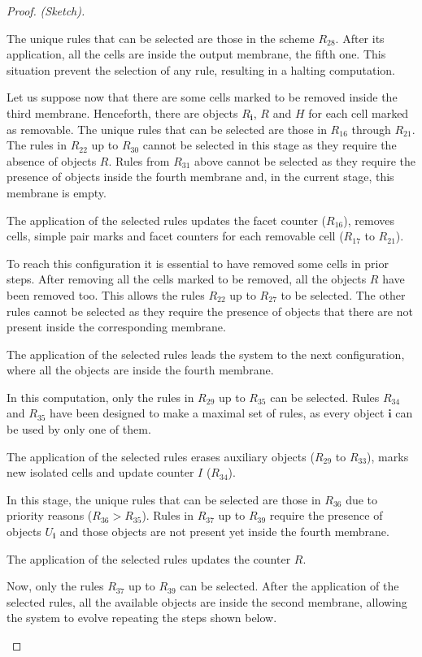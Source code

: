\documentclass[journal]{IEEEtran}
\begin{document}
\begin{proof} {\it (Sketch).}
\begin{list}{\textbf{Step }}{}
\begin{list}{)}{}
The unique rules that can be selected are those in the scheme $R_{28}$. After its
application, all the cells are inside the output membrane, the fifth one. This
situation prevent the selection of any rule, resulting in a halting computation.
\item Let us suppose now that there are some cells marked to be removed inside the third
membrane. Henceforth, there are objects $R_\mathbf{i}$, $R$ and $H$ for each
cell marked as removable. The unique rules that can be selected are those in
$R_{16}$ through $R_{21}$. The rules in $R_{22}$ up to $R_{30}$ cannot be
selected in this stage as they require the absence of objects $R$. Rules from
$R_{31}$ above cannot be selected as they require the presence of objects
inside the fourth membrane and, in the current stage, this membrane is empty.

The application of the selected rules updates the facet counter
($R_{16}$), removes cells, simple pair marks and facet counters for
each removable cell ($R_{17}$ to $R_{21}$).
\end{list}
\item To reach this configuration it is essential to have removed some cells in
prior steps. After removing all the cells marked to be removed, all the objects
$R$ have been removed too. This allows the rules $R_{22}$ up to $R_{27}$ to be
selected. The other rules cannot be selected as they require the presence of
objects that there are not present inside the corresponding membrane.

The application of the selected rules leads the system to the next
configuration, where all the objects are inside the fourth membrane.
\item In this computation, only the rules in $R_{29}$ up to $R_{35}$ can be
selected. Rules $R_{34}$ and $R_{35}$ have been designed to make a maximal set
of rules, as every object $\mathbf{i}$ can be used by only one of them.

The application of the selected rules erases auxiliary objects ($R_{29}$ to
$R_{33}$), marks new isolated cells and update counter $I$ ($R_{34}$).
\item In this stage, the unique rules that can be selected are those in $R_{36}$
due to priority reasons ($R_{36} > R_{35}$). Rules in $R_{37}$ up to $R_{39}$
require the presence of objects $U_\mathbf{i}$ and those objects are not
present yet inside the fourth membrane.

The application of the selected rules updates the counter $R$.
\item Now, only the rules $R_{37}$ up to $R_{39}$ can be
selected. After the application of the selected rules, all the available objects
are inside the second membrane, allowing the system to evolve repeating the
steps shown below.
\end{list}

\end{proof}
\end{document}
